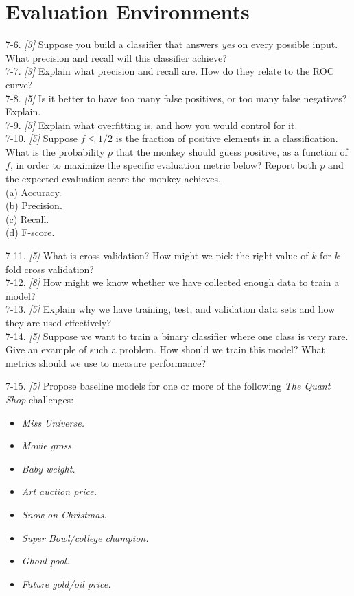 \documentclass[10pt]{article}
\begin{document}
\section*{Evaluation Environments}
7-6. \textit{[3]} Suppose you build a classifier that answers \textit{yes} on every possible input. What precision and recall will this classifier achieve?\\[0pt]
7-7. \textit{[3]} Explain what precision and recall are. How do they relate to the ROC curve?\\[0pt]
7-8. \textit{[5]} Is it better to have too many false positives, or too many false negatives? Explain.\\[0pt]
7-9. \textit{[5]} Explain what overfitting is, and how you would control for it.\\[0pt]
7-10. \textit{[5]} Suppose $f \leq 1/2$ is the fraction of positive elements in a classification. What is the probability $p$ that the monkey should guess positive, as a function of $f$, in order to maximize the specific evaluation metric below? Report both $p$ and the expected evaluation score the monkey achieves.\\
(a) Accuracy.\\
(b) Precision.\\
(c) Recall.\\
(d) F-score.

7-11. \textit{[5]} What is cross-validation? How might we pick the right value of $k$ for $k$-fold cross validation?\\[0pt]
7-12. \textit{[8]} How might we know whether we have collected enough data to train a model?\\[0pt]
7-13. \textit{[5]} Explain why we have training, test, and validation data sets and how they are used effectively?\\[0pt]
7-14. \textit{[5]} Suppose we want to train a binary classifier where one class is very rare. Give an example of such a problem. How should we train this model? What metrics should we use to measure performance?

7-15. \textit{[5]} Propose baseline models for one or more of the following \textit{The Quant Shop} challenges:

\begin{itemize}
  \item \textit{Miss Universe.}
  \item \textit{Movie gross.}
  \item \textit{Baby weight.}
  \item \textit{Art auction price.}
  \item \textit{Snow on Christmas.}
  \item \textit{Super Bowl/college champion.}
  \item \textit{Ghoul pool.}
  \item \textit{Future gold/oil price.}
\end{itemize}
\end{document}
